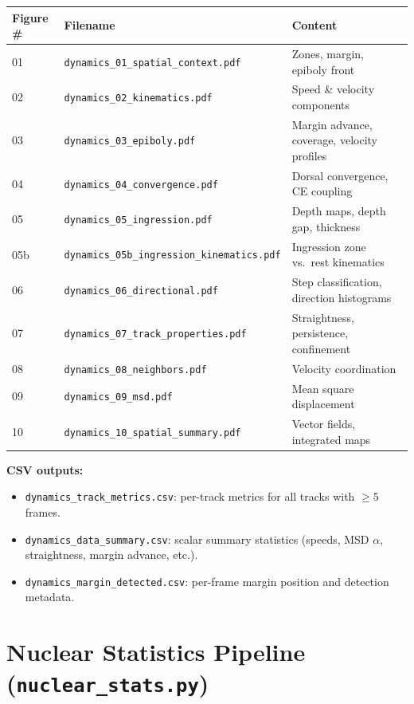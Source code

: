 \documentclass[11pt,a4paper]{article}
\begin{document}
\begin{longtable}{l l l}
\toprule
\textbf{Figure \#} & \textbf{Filename} & \textbf{Content} \\
\midrule
01  & \texttt{dynamics\_01\_spatial\_context.pdf}       & Zones, margin, epiboly front \\
02  & \texttt{dynamics\_02\_kinematics.pdf}              & Speed \& velocity components \\
03  & \texttt{dynamics\_03\_epiboly.pdf}                 & Margin advance, coverage, velocity profiles \\
04  & \texttt{dynamics\_04\_convergence.pdf}              & Dorsal convergence, CE coupling \\
05  & \texttt{dynamics\_05\_ingression.pdf}               & Depth maps, depth gap, thickness \\
05b & \texttt{dynamics\_05b\_ingression\_kinematics.pdf}  & Ingression zone vs.\ rest kinematics \\
06  & \texttt{dynamics\_06\_directional.pdf}              & Step classification, direction histograms \\
07  & \texttt{dynamics\_07\_track\_properties.pdf}        & Straightness, persistence, confinement \\
08  & \texttt{dynamics\_08\_neighbors.pdf}                & Velocity coordination \\
09  & \texttt{dynamics\_09\_msd.pdf}                      & Mean square displacement \\
10  & \texttt{dynamics\_10\_spatial\_summary.pdf}          & Vector fields, integrated maps \\
\bottomrule
\end{longtable}

\noindent\textbf{CSV outputs:}
\begin{itemize}[nosep]
  \item \texttt{dynamics\_track\_metrics.csv}: per-track metrics for all
    tracks with $\ge 5$ frames.
  \item \texttt{dynamics\_data\_summary.csv}: scalar summary statistics
    (speeds, MSD $\alpha$, straightness, margin advance, etc.).
  \item \texttt{dynamics\_margin\_detected.csv}: per-frame margin position
    and detection metadata.
\end{itemize}


\newpage
\section*{Nuclear Statistics Pipeline (\texttt{nuclear\_stats.py})}
\label{sec:nuclear_stats_py}
\end{document}
